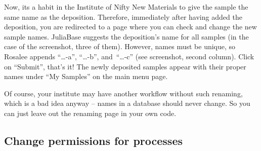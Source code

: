 \documentclass[a4paper,11pt,english]{sphinxmanual}
\begin{document}
{\hfill{}}

Now, its a habit in the Institute of Nifty New Materials to give the sample the
same name as the deposition.  Therefore, immediately after having added the
deposition, you are redirected to a page where you can check and change the new
sample names.  JuliaBase suggests the deposition's name for all samples (in the
case of the screenshot, three of them).  However, names must be unique, so
Rosalee appends “…-a”, “…-b”, and “…-c” (see screenshot, second column).  Click
on “Submit”, that's it!  The newly deposited samples appear with their proper
names under “My Samples” on the main menu page.

Of course, your institute may have another workflow without such renaming,
which is a bad idea anyway – names in a database should never change.  So you
can just leave out the renaming page in your own code.


\subsection{Change permissions for processes}
\label{demo:permissions-to-processes}\label{demo:change-permissions-for-processes}\label{demo:index-14}
{\hfill{}}
\end{document}
